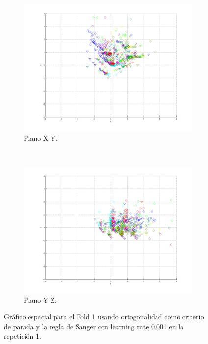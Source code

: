 \documentclass[informe.tex]{subfiles}
\begin{document}
\begin{figure}[H]
        \hspace*{-6.5cm}
        \begin{subfigure}[b]{0.49\textwidth}
                \includegraphics[width=\textwidth]{graficos/fold1_criterioParadao_reglas_alpha0_rep1_2XY.png}
                \caption{Plano X-Y.}
        \end{subfigure}
        ~
        \begin{subfigure}[b]{0.49\textwidth}
                \includegraphics[width=\textwidth]{graficos/fold1_criterioParadao_reglas_alpha0_rep1_3YZ.png}
                \caption{Plano Y-Z.}
        \end{subfigure}
	\restoregeometry
        \caption{Gráfico espacial para el Fold 1 usando ortogonalidad como criterio de parada y la regla de Sanger con learning rate 0.001 en la repetición 1.}
        \label{fig:fold1_criterioParadao_reglas_alpha0_rep1}
	\end{figure}
      
\end{document}
